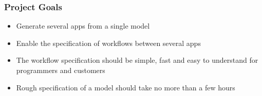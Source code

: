 \begin{frame}[t]
    \frametitle{Project Goals}
    
    \begin{itemize}
       \item Generate several apps from a single model
       \item Enable the specification of workflows between several apps
       \item The workflow specification should be simple, fast and easy to understand for programmers and customers
       \item Rough specification of a model should take no more than a few hours
       
    \end{itemize}
\end{frame}


